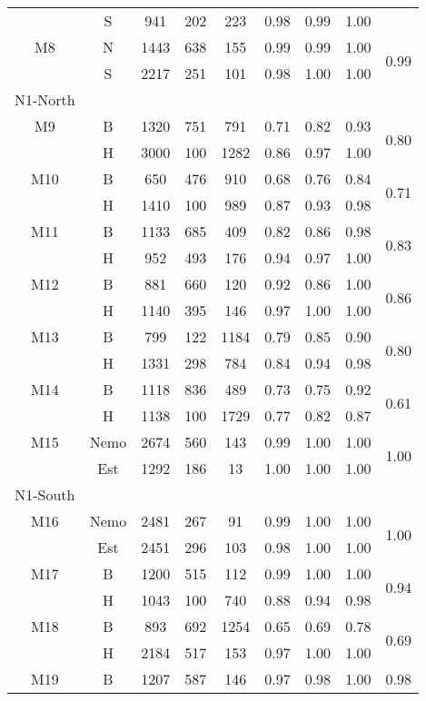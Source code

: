\begin{longtable}{c c c c c c c c c}
     & S & 941 & 202 & 223 & 0.98 & 0.99 & 1.00  & \\
  M8 & N & 1443 & 638 & 155 & 0.99 & 0.99 & 1.00 & \multirow{2}{*}{0.99}\\
     & S & 2217 & 251 & 101 & 0.98 & 1.00 & 1.00 & \\
  \midrule
  N1-North\\
  \midrule
  M9 & B & 1320 & 751 & 791 & 0.71 & 0.82 & 0.93 & \multirow{2}{*}{0.80}\\
     & H & 3000 & 100 & 1282 & 0.86 & 0.97 & 1.00 &\\
  M10 & B & 650 & 476 & 910 & 0.68 & 0.76 & 0.84 & \multirow{2}{*}{0.71}\\
      & H & 1410 & 100 & 989 & 0.87 & 0.93 & 0.98 & \\
  M11 & B & 1133 & 685 & 409 & 0.82 & 0.86 & 0.98 & \multirow{2}{*}{0.83}\\
      & H & 952 & 493 & 176 & 0.94 & 0.97 & 1.00 & \\
  M12 & B & 881 & 660 & 120 & 0.92 & 0.86 & 1.00 & \multirow{2}{*}{0.86}\\
      & H & 1140 & 395 & 146 & 0.97 & 1.00 & 1.00 &\\
  M13 & B & 799 & 122 & 1184 & 0.79 & 0.85 & 0.90 & \multirow{2}{*}{0.80}\\
      & H & 1331 & 298 & 784 & 0.84 & 0.94 & 0.98 & \\
  M14 & B & 1118 & 836 & 489 & 0.73 & 0.75 & 0.92 & \multirow{2}{*}{0.61}\\
      & H & 1138 & 100 & 1729 & 0.77 & 0.82 & 0.87 & \\
  M15 & Nemo & 2674 & 560 & 143 & 0.99 & 1.00 & 1.00 & \multirow{2}{*}{1.00}\\
      & Est & 1292 & 186 & 13 & 1.00 & 1.00 & 1.00\\
  \midrule
  N1-South\\
  \midrule
  M16 & Nemo & 2481 & 267 & 91 & 0.99 & 1.00 & 1.00 & \multirow{2}{*}{1.00}\\
      & Est & 2451 & 296 & 103 & 0.98 & 1.00 & 1.00 &\\
  M17 & B & 1200 & 515 & 112 & 0.99 & 1.00 & 1.00 & \multirow{2}{*}{0.94}\\
      & H & 1043 & 100 & 740 & 0.88 & 0.94 & 0.98 &\\
  M18 & B & 893 & 692 & 1254 & 0.65 & 0.69 & 0.78 & \multirow{2}{*}{0.69}\\
      & H & 2184 & 517 & 153 & 0.97 & 1.00 & 1.00 & \\
  M19 & B & 1207 & 587 & 146 & 0.97 & 0.98 & 1.00 & \multirow{2}{*}{0.98}\\

\end{longtable}
